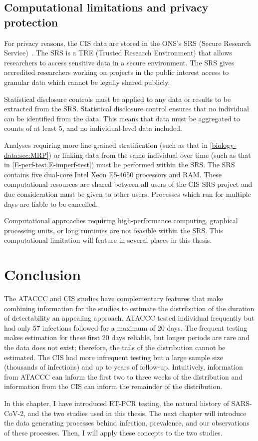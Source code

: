 \documentclass[thesis.tex]{subfiles}
\begin{document}
\subsection{Computational limitations and privacy protection} \label{biology-data:sec:SRS}

For privacy reasons, the CIS data are stored in the ONS's SRS (Secure Research Service)~\autocite{onsSRS}.
The SRS is a TRE (Trusted Research Environment) that allows researchers to access sensitive data in a secure environment.
The SRS gives accredited researchers working on projects in the public interest access to granular data which cannot be legally shared publicly.

Statistical disclosure controls must be applied to any data or results to be extracted from the SRS.
Statistical disclosure control ensures that no individual can be identified from the data.
This means that data must be aggregated to counts of at least 5, and no individual-level data included.

Analyses requiring more fine-grained stratification (such as that in \cref{biology-data:sec:MRP}) or linking data from the same individual over time (such as that in \cref{E-perf-test,E-imperf-test}) must be performed within the SRS.
The SRS contains five  dual-core Intel Xeon E5-4650 processors and  RAM.
These computational resources are shared between all users of the CIS SRS project and due consideration must be given to other users.
Processes which run for multiple days are liable to be cancelled.

Computational approaches requiring high-performance computing, graphical processing units, or long runtimes are not feasible within the SRS.
This computational limitation will feature in several places in this thesis.

\section{Conclusion}

The ATACCC and CIS studies have complementary features that make combining information for the studies to estimate the distribution of the duration of detectability an appealing approach.
ATACCC tested individual frequently but had only 57 infections followed for a maximum of 20 days.
The frequent testing makes estimation for these first 20 days reliable, but longer periods are rare and the data does not exist; therefore, the tails of the distribution cannot be estimated.
The CIS had more infrequent testing but a large sample size (thousands of infections) and up to years of follow-up.
Intuitively, information from ATACCC can inform the first two to three weeks of the distribution and information from the CIS can inform the remainder of the distribution.

In this chapter, I have introduced RT-PCR testing, the natural history of SARS-CoV-2, and the two studies used in this thesis.
The next chapter will introduce the data generating processes behind infection, prevalence, and our observations of these processes.
Then, I will apply these concepts to the two studies.


\ifSubfilesClassLoaded{
  \listoftodos
}{}
\end{document}
